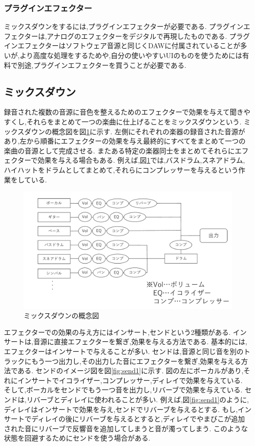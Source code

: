 \documentclass[12pt,a4j,titlepage]{ltjsarticle}
\begin{document}
\subsubsection{プラグインエフェクター}
ミックスダウンをするには,プラグインエフェクターが必要である.
プラグインエフェクターは,アナログのエフェクターをデジタルで再現したものである.
プラグインエフェクターはソフトウェア音源と同じくDAWに付属されていることが多いが,より高度な処理をするためや,自分の使いやすいUIのものを使うためには有料で別途,プラグインエフェクターを買うことが必要である.

\subsection{ミックスダウン}
録音された複数の音源に音色を整えるためのエフェクターで効果を与えて聞きやすくし,それらをまとめて一つの楽曲に仕上げることをミックスダウンという.
ミックスダウンの概念図を図\ref{fig:gainen}に示す.
左側にそれぞれの楽器の録音された音源があり,左から順番にエフェクターの効果を与え最終的にすべてをまとめて一つの楽曲の音源として完成させる.
またある特定の楽器同士をまとめてそれらにエフェクターで効果を与える場合もある.
例えば,図\ref{fig:gainen}では,バスドラム,スネアドラム,ハイハットをドラムとしてまとめて,それらにコンプレッサーを与えるという作業をしている.

\begin{figure}[H]
\centering
 \includegraphics[width=120mm]{./figures/gainen.pdf}
 \caption{ミックスダウンの概念図}
 \label{fig:gainen}
\end{figure}

エフェクターでの効果の与え方にはインサート,センドという2種類がある.
インサートは,音源に直接エフェクターを繋ぎ,効果を与える方法である.
基本的には,エフェクターはインサートで与えることが多い.
センドは,音源と同じ音を別のトラックにもう一つ出力し,その出力した音にエフェクターを繋ぎ,効果を与える方法である.
センドのイメージ図を図\ref{fig:send1}に示す.
図の左にボーカルがあり,それにインサートでイコライザー,コンプレッサー,ディレイで効果を与えている.
そして,ボーカルをセンドでもう一つ音を出力し,リバーブで効果を与えている.
センドは,リバーブとディレイに使われることが多い.
例えば,図\ref{fig:send1}のように,ディレイはインサートで効果を与え,センドでリバーブを与えるとする.
もし,インサートでディレイの後にリバーブを与えるとすると,ディレイでやまびこが追加された音にリバーブで反響音を追加してしまうと音が濁ってしまう.
このような状態を回避するためにセンドを使う場合がある.
\end{document}
